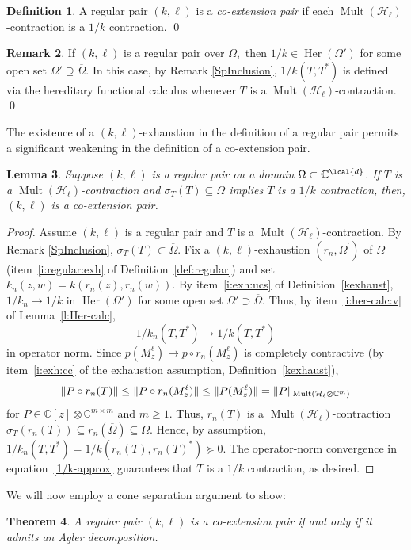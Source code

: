 \documentclass[a4paper,reqno,index]{amsart}
\newcommand{\df}[1]{{\textit{#1}}{\index{#1}}}
\numberwithin{equation}{section}
\newtheorem{theorem}{Theorem}[section]
\newtheorem{lemma}[theorem]{Lemma}
\newcommand{\Mult}{\operatorname{Mult}}
\newcommand{\cH}{\mathcal{H}}
\newcommand{\specT}{\sigma_T}  %
\newcommand{\ol}[1]{\overline{#1}}
\newcommand{\Oml}{\Omega} %
\newcommand{\Her}{\operatorname{Her}}
\theoremstyle{definition}
\newtheorem{definition}[theorem]{Definition}
\newtheorem{remark}[theorem]{Remark}
\begin{document}
 
\begin{definition} \label{coextprop}
  A regular pair  $(k, \ell)$ is a \df{co-extension pair} if each $\Mult(\cH_\ell)$-contraction
  is a $1/k$ contraction.
\qed\end{definition}


 \begin{remark}\label{well-def:rem}
 If $(k, \ell)$ is a regular pair over $\Omega,$ then  $1/k\in\Her{(\Omega')}$ for some open set $\Omega'\supseteq\overline{\Omega}$. 
 In this case, by  Remark \ref{SpInclusion}, $1/k(T, T^*)$ is defined via the hereditary functional calculus whenever $T$ is a $\Mult(\cH_\ell)$-contraction. 
 \qed
 \end{remark}
 

 
The existence of a $(k,\ell)$-exhaustion in the definition of a regular pair permits a 
significant weakening in the definition of a co-extension pair.

 
\begin{lemma} \label{relax-coext}
Suppose  $(k, \ell)$ is a regular pair   on a domain $\Omega\subset\mathbb{C}^{\lcal{d}}$. If
 $T$ is a $\Mult(\cH_\ell)$-contraction and $\specT(T)\subseteq \Oml$ implies $T$ is a $1/k$ contraction,
 then, $(k,\ell)$ is a co-extension pair. 
\end{lemma}

\begin{proof}
Assume $(k, \ell)$ is a regular pair and  $T$ is a $\Mult(\cH_\ell)$-contraction. By Remark \ref{SpInclusion},  $\specT(T)\subset\overline{\Omega}.$  Fix a $(k, \ell)$-exhaustion $(r_n,\Omega^\prime)$ of $\Omega$ (item~\ref{i:regular:exh} of Definition~\ref{def:regular}) and set $k_n(z,w)=k(r_n(z), r_n(w)).$  By item~\ref{i:exh:ucs} of Definition~\ref{kexhaust}, $1/k_n\to 1/k$ in $\Her(\Omega')$ for some open set $\Omega'\supset\overline{\Omega}$.  Thus, by item~\ref{i:her-calc:v} of Lemma~\ref{l:Her-calc}, 
\begin{equation}\label{1/k-approx}
1/k_n(T, T^*)\to 1/k(T, T^*)
\end{equation}
in operator norm.
Since $p(M^{\ell}_z)\mapsto p\circ r_n(M^{\ell}_z)$ is  completely contractive (by item~\ref{i:exh:cc}
of the exhaustion assumption, Definition~\ref{kexhaust}), 
  \[
\|P\circ r_n(T)\|\le \|P\circ r_n(M_z^\ell)\|
  \le \| P(M_z^\ell)\| = \|P \|_{\textup{Mult}(\mathcal{H}_{\ell}\otimes\mathbb{C}^m)}
  \]
  for {$P\in\mathbb{C}[z]\otimes\mathbb{C}^{m\times m}$}  and $m\ge 1.$ Thus, 
   $r_n(T)$ is a $\Mult(\cH_\ell)$-contraction   $\specT(r_n(T)) \subseteq r_n(\ol{\Omega}) \subseteq \Omega.$  Hence, by assumption,  $1/k_n(T, T^*)=1/k(r_n(T), r_n(T)^*)\succeq 0. $ 
   The operator-norm convergence in equation~\eqref{1/k-approx} guarantees that $T$ is a $1/k$ contraction, as desired. 
\end{proof}
We will now employ a cone separation argument to show:
\begin{theorem}\label{COEXTISAGLER}
A regular pair   $(k, \ell)$ is a co-extension pair if and only if it admits an Agler decomposition. 
\end{theorem}
\end{document}
